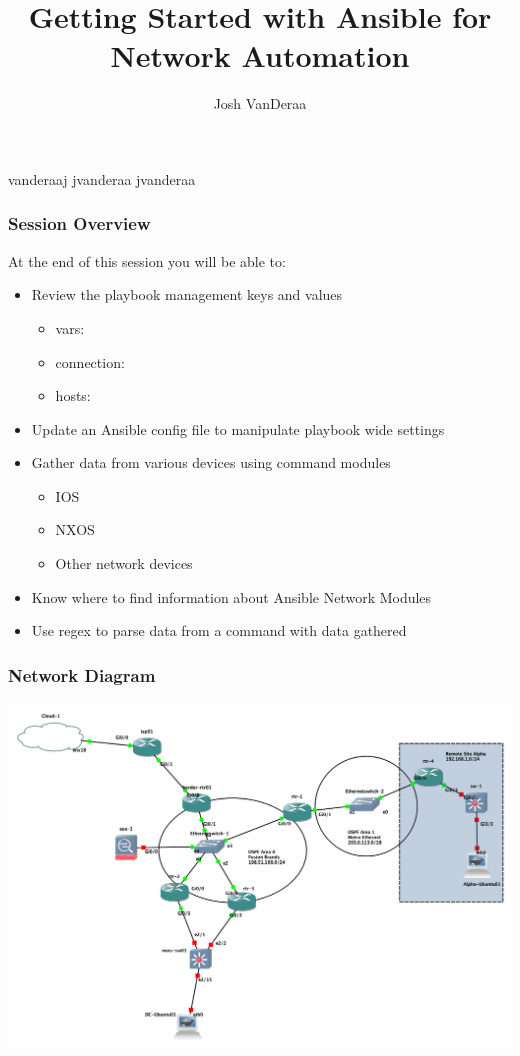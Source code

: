 \documentclass{beamer}
\title{Getting Started with Ansible for Network Automation}
\date{}
\author{Josh VanDeraa}
\begin{document}
\begin{frame}
  \maketitle
  \footnotesize
  \faTwitter vanderaaj \hfill \faGithub jvanderaa \hfill \faSlack jvanderaa
\end{frame}

\begin{frame}
\frametitle{Session Overview}
At the end of this session you will be able to:
\begin{itemize}
    
  \item <2-> Review the playbook management keys and values
  \begin{itemize}
    \item <3-> vars:
    \item <4-> connection:
    \item <5-> hosts:
  \end{itemize}
  \item <6-> Update an Ansible config file to manipulate playbook wide settings
  \item <7-> Gather data from various devices using command modules
    \begin{itemize}
        \item IOS
        \item NXOS
        \item Other network devices
    \end{itemize}
  \item <8-> Know where to find information about Ansible Network Modules
  \item <9-> Use regex to parse data from a command with data gathered
\end{itemize}
\end{frame}

\begin{frame}
\frametitle{Network Diagram}
\includegraphics[width=\textwidth]{assets/base_setup.png}
\end{frame}
\end{document}
